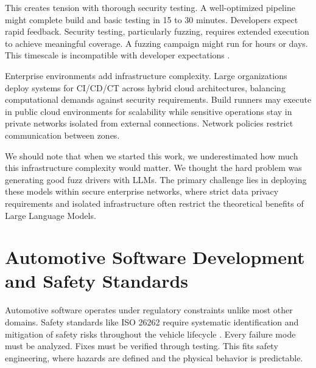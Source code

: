 This creates tension with thorough security testing. A well-optimized pipeline might complete build and basic testing in 15 to 30 minutes. Developers expect rapid feedback. Security testing, particularly fuzzing, requires extended execution to achieve meaningful coverage. A fuzzing campaign might run for hours or days. This timescale is incompatible with developer expectations \cite{CiCdFuzzing2022}.

Enterprise environments add infrastructure complexity. Large organizations deploy systems for CI/CD/CT across hybrid cloud architectures, balancing computational demands against security requirements. Build runners may execute in public cloud environments for scalability while sensitive operations stay in private networks isolated from external connections. Network policies restrict communication between zones.

We should note that when we started this work, we underestimated how much this infrastructure complexity would matter. We thought the hard problem was generating good fuzz drivers with LLMs. The primary challenge lies in deploying these models within secure enterprise networks, where strict data privacy requirements and isolated infrastructure often restrict the theoretical benefits of Large Language Models.

\section{Automotive Software Development and Safety Standards}
\label{sec:lit_automotive_standards}

Automotive software operates under regulatory constraints unlike most other domains. Safety standards like ISO 26262 require systematic identification and mitigation of safety risks throughout the vehicle lifecycle \cite{ISO26262}. Every failure mode must be analyzed. Fixes must be verified through testing. This fits safety engineering, where hazards are defined and the physical behavior is predictable.

